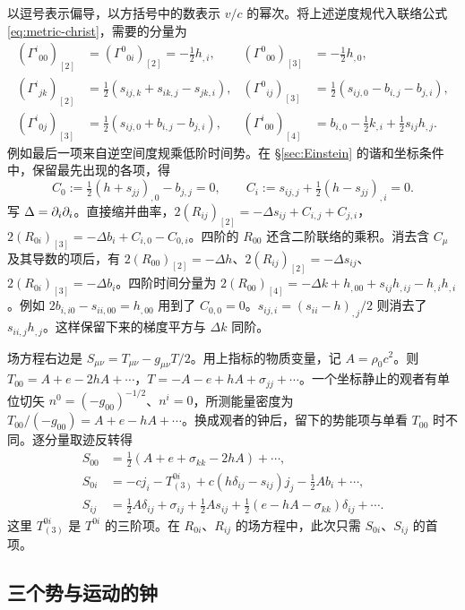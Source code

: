 以逗号表示偏导，以方括号中的数表示 $v/c$ 的幂次。将上述逆度规代入联络公式 \eqref{eq:metric-christ}，需要的分量为
\begin{align*}
 (\Gamma^i{}_{00})_{[2]}&=(\Gamma^0{}_{0i})_{[2]}=-\tfrac12h_{,i},&
 (\Gamma^0{}_{00})_{[3]}&=-\tfrac12h_{,0},\\
 (\Gamma^i{}_{jk})_{[2]}&=\tfrac12(s_{ij,k}+s_{ik,j}-s_{jk,i}),&
 (\Gamma^0{}_{ij})_{[3]}&=\tfrac12(s_{ij,0}-b_{i,j}-b_{j,i}),\\
 (\Gamma^i{}_{0j})_{[3]}&=\tfrac12(s_{ij,0}+b_{i,j}-b_{j,i}),&
 (\Gamma^i{}_{00})_{[4]}&=b_{i,0}-\tfrac12 k_{,i}+\tfrac12s_{ij}h_{,j}.
\end{align*}
例如最后一项来自逆空间度规乘低阶时间势。在 \S\ref{sec:Einstein} 的谐和坐标条件中，保留最先出现的各项，得
\[
 C_0:=\tfrac12(h+s_{jj})_{,0}-b_{j,j}=0,\qquad
 C_i:=s_{ij,j}+\tfrac12(h-s_{jj})_{,i}=0 .
\]
写 $\Delta=\partial_i\partial_i$。直接缩并曲率，$2(R_{ij})_{[2]}=-\Delta s_{ij}+C_{i,j}+C_{j,i}$，$2(R_{0i})_{[3]}=-\Delta b_i+C_{i,0}-C_{0,i}$。四阶的 $R_{00}$ 还含二阶联络的乘积。消去含 $C_\mu$ 及其导数的项后，有 $2(R_{00})_{[2]}=-\Delta h$、$2(R_{ij})_{[2]}=-\Delta s_{ij}$、$2(R_{0i})_{[3]}=-\Delta b_i$。四阶时间分量为 $2(R_{00})_{[4]}=-\Delta k+h_{,00}+s_{ij}h_{,ij}-h_{,i}h_{,i}$。例如 $2b_{i,i0}-s_{ii,00}=h_{,00}$ 用到了 $C_{0,0}=0$。$s_{ij,i}=(s_{ii}-h)_{,j}/2$ 则消去了 $s_{ii,j}h_{,j}$。这样保留下来的梯度平方与 $\Delta k$ 同阶。

场方程右边是 $S_{\mu\nu}=T_{\mu\nu}-g_{\mu\nu}T/2$。用上指标的物质变量，记 $A=\rho_0c^2$。则 $T_{00}=A+e-2hA+\cdots$，$T=-A-e+hA+\sigma_{jj}+\cdots$。一个坐标静止的观者有单位切矢 $n^0=(-g_{00})^{-1/2}$、$n^i=0$，所测能量密度为 $T_{00}/(-g_{00})=A+e-hA+\cdots$。换成观者的钟后，留下的势能项与单看 $T_{00}$ 时不同。逐分量取迹反转得
\begin{align*}
 S_{00}&=\tfrac12(A+e+\sigma_{kk}-2hA)+\cdots,\\
 S_{0i}&=-cj_i-T^{0i}_{(3)}+c(h\delta_{ij}-s_{ij})j_j-\tfrac12Ab_i+\cdots,\\
 S_{ij}&=\tfrac12 A\delta_{ij}+\sigma_{ij}+\tfrac12As_{ij}
           +\tfrac12(e-hA-\sigma_{kk})\delta_{ij}+\cdots .
\end{align*}
这里 $T^{0i}_{(3)}$ 是 $T^{0i}$ 的三阶项。在 $R_{0i}$、$R_{ij}$ 的场方程中，此次只需 $S_{0i}$、$S_{ij}$ 的首项。

\subsection{三个势与运动的钟}\label{sec:pn-three}

